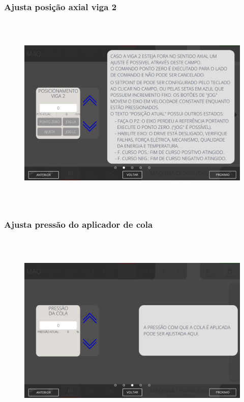 \newpage
\thispagestyle{fancy}
\vspace*{\fill}
\subsubsection{\small{Ajusta posição axial viga 2}}
\begin{figure}[h]
  \centering
  \includegraphics[width=576px,height=360px]{src/imagesFlexo/07-fold/settings/e-2.png}
\end{figure}
\vspace*{\fill}

\newpage
\thispagestyle{fancy}
\vspace*{\fill}
\subsubsection{\small{Ajusta pressão do aplicador de cola}}
\begin{figure}[h]
  \centering
  \includegraphics[width=576px,height=360px]{src/imagesFlexo/07-fold/settings/e-3.png}
\end{figure}
\vspace*{\fill}


